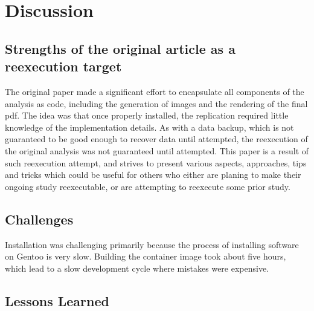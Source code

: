\section{Discussion}

\subsection{Strengths of the original article as a reexecution target}
The original paper made a significant effort to encapsulate all
components of the analysis as code, including the generation of images
and the rendering of the final pdf. The idea was that once properly installed, the
replication required little knowledge of the implementation details.
As with a data backup, which is not guaranteed to be good enough to recover
data until attempted, the reexecution of the original analysis was not guaranteed
until attempted.
This paper is a result of such reexecution attempt, and strives to present various
aspects, approaches, tips and tricks which could be useful for others who either are
planing to make their ongoing study reexecutable, or are attempting to reexecute
some prior study.

\subsection{Challenges}
Installation was challenging primarily because the process of installing
software on Gentoo is very slow. Building the container image took
about five hours, which lead to a slow development cycle where mistakes
were expensive.




\subsection{Lessons Learned}

